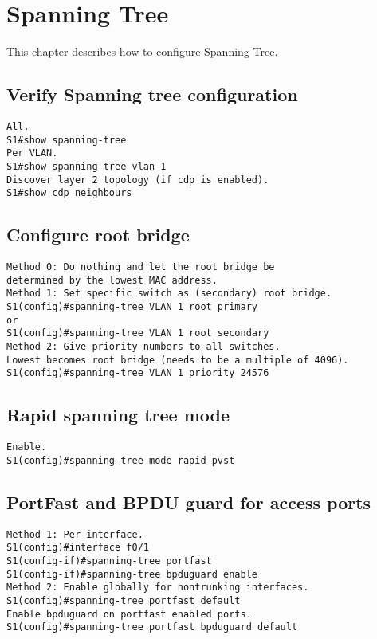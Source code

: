\section{Spanning Tree}
This chapter describes how to configure Spanning Tree.
\subsection{Verify Spanning tree configuration}
\begin{verbatim}
All.
S1#show spanning-tree
Per VLAN.
S1#show spanning-tree vlan 1
Discover layer 2 topology (if cdp is enabled).
S1#show cdp neighbours
\end{verbatim}
\subsection{Configure root bridge}
\begin{verbatim}
Method 0: Do nothing and let the root bridge be 
determined by the lowest MAC address.
Method 1: Set specific switch as (secondary) root bridge.
S1(config)#spanning-tree VLAN 1 root primary
or 
S1(config)#spanning-tree VLAN 1 root secondary
Method 2: Give priority numbers to all switches. 
Lowest becomes root bridge (needs to be a multiple of 4096).
S1(config)#spanning-tree VLAN 1 priority 24576
\end{verbatim}
\subsection{Rapid spanning tree mode}
\begin{verbatim}
Enable.
S1(config)#spanning-tree mode rapid-pvst
\end{verbatim}
\subsection{PortFast and BPDU guard for access ports}
\begin{verbatim}
Method 1: Per interface.
S1(config)#interface f0/1
S1(config-if)#spanning-tree portfast
S1(config-if)#spanning-tree bpduguard enable
Method 2: Enable globally for nontrunking interfaces.
S1(config)#spanning-tree portfast default
Enable bpduguard on portfast enabled ports.
S1(config)#spanning-tree portfast bpduguard default
\end{verbatim}
